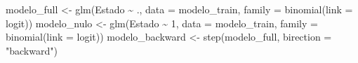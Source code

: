 \documentclass[
]{article}
\newenvironment{Shaded}{\begin{snugshade}}{\end{snugshade}}
\newcommand{\AttributeTok}[1]{\textcolor[rgb]{0.77,0.63,0.00}{#1}}
\newcommand{\DecValTok}[1]{\textcolor[rgb]{0.00,0.00,0.81}{#1}}
\newcommand{\FunctionTok}[1]{\textcolor[rgb]{0.00,0.00,0.00}{#1}}
\newcommand{\NormalTok}[1]{#1}
\newcommand{\OtherTok}[1]{\textcolor[rgb]{0.56,0.35,0.01}{#1}}
\newcommand{\SpecialCharTok}[1]{\textcolor[rgb]{0.00,0.00,0.00}{#1}}
\newcommand{\StringTok}[1]{\textcolor[rgb]{0.31,0.60,0.02}{#1}}
\begin{document}
\begin{Shaded}
\begin{Highlighting}[]
\NormalTok{modelo\_full }\OtherTok{\textless{}{-}} \FunctionTok{glm}\NormalTok{(Estado }\SpecialCharTok{\textasciitilde{}}\NormalTok{ ., }\AttributeTok{data =}\NormalTok{ modelo\_train, }\AttributeTok{family =} \FunctionTok{binomial}\NormalTok{(}\AttributeTok{link =} \StringTok{\textquotesingle{}logit\textquotesingle{}}\NormalTok{))}
\NormalTok{modelo\_nulo }\OtherTok{\textless{}{-}} \FunctionTok{glm}\NormalTok{(Estado }\SpecialCharTok{\textasciitilde{}} \DecValTok{1}\NormalTok{, }\AttributeTok{data =}\NormalTok{ modelo\_train, }\AttributeTok{family =} \FunctionTok{binomial}\NormalTok{(}\AttributeTok{link =} \StringTok{\textquotesingle{}logit\textquotesingle{}}\NormalTok{))}
\NormalTok{modelo\_backward }\OtherTok{\textless{}{-}} \FunctionTok{step}\NormalTok{(modelo\_full, }\AttributeTok{birection =} \StringTok{"backward"}\NormalTok{)}
\end{Highlighting}
\end{Shaded}
\end{document}
